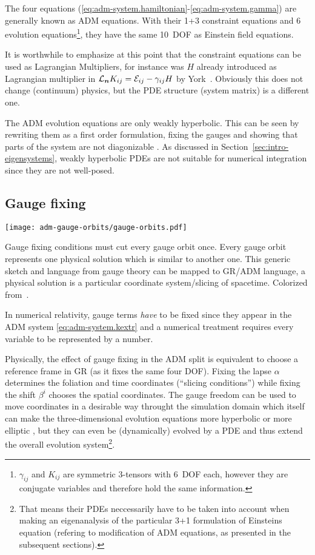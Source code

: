 The four equations (\ref{eq:adm-system.hamiltonian}-\ref{eq:adm-system.gamma})
are generally known as ADM equations.
With their 1+3 constraint equations and 6 evolution
equations\footnote{$\gamma_{ij}$ and $K_{ij}$ are symmetric 3-tensors with
	6~DOF each, however they are conjugate variables and therefore hold the 
	same information.}, they have the same 10~DOF as Einstein 
	field equations.

It is worthwhile to emphasize at this point that the constraint equations can
be used as Lagrangian Multipliers, for instance was $H$ already 
introduced
as Lagrangian multiplier in
$\mathcal{L}_{\boldsymbol n} K_{ij} = \mathcal E_{ij} - \gamma_{ij} H$ by 
York~\cite{York79}.
Obviously this does not change (continuum) physics, but the PDE
structure (system matrix) is a different one.

The ADM evolution equations are only weakly hyperbolic. This can be seen by
rewriting them as a first order formulation, fixing the gauges and showing
that parts of the system are not diagonizable \cite{Alcubierre:2008}.
As discussed in Section~\ref{sec:intro-eigensystems}, weakly hyperbolic PDEs
are not suitable for numerical integration since they are not well-posed.

\subsection{Gauge fixing}\label{sec:gauge-fixing}
\begin{marginfigure}[-2cm]
	\texttt{[image: adm-gauge-orbits/gauge-orbits.pdf]}
	\caption[Gauge orbits, 
	]{
		Gauge fixing conditions must cut every gauge orbit 
		once. Every
		gauge orbit represents one physical solution which is 
		similar to
		another one. This generic sketch and language from 
		gauge theory can be
		mapped to GR/ADM language, a physical solution is a 
		particular
		coordinate system/slicing of spacetime.
		Colorized from~\cite{Meusburger:2010fs}.
	}
\end{marginfigure}%
In numerical relativity, gauge terms \emph{have} to be fixed since they appear
in the ADM system \eqref{eq:adm-system.kextr} and a numerical treatment requires
every variable to be represented by a number.

Physically, the effect of gauge fixing in the ADM split is equivalent to choose
a reference frame in GR (as it fixes the same four DOF). Fixing the lapse $\alpha$ determines the foliation and time coordinates
(``slicing conditions'') while fixing the shift $\beta^i$ chooses the spatial
coordinates. The gauge freedom can be
used to move coordinates in a desirable way throught the simulation domain which itself
can make the three-dimensional evolution equations more hyperbolic or more
elliptic \cite{Gourgoulhon2012}, but they can even be (dynamically) evolved
by a PDE and thus extend the overall evolution system\footnote{
 That means their PDEs neccessarily have to be taken into account when
 making an eigenanalysis of the particular 3+1 formulation of Einsteins
 equation (refering to modification of ADM equations, as presented
 in the subsequent sections).
}.

